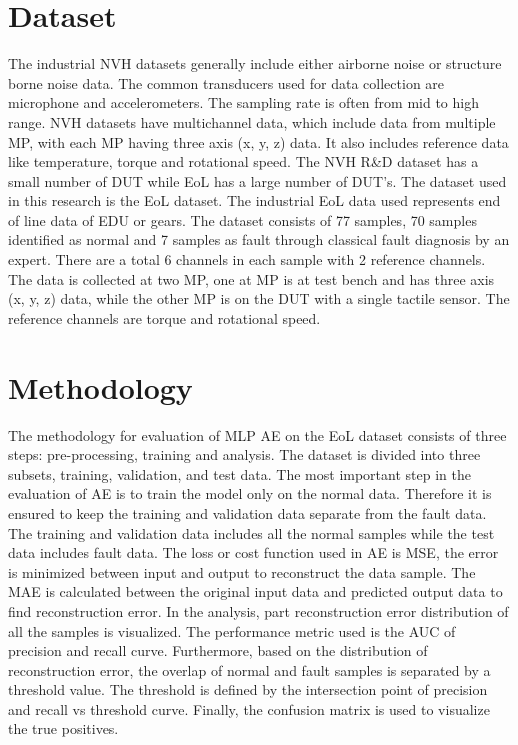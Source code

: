 \documentclass[conference]{IEEEtran}
\begin{document}
\section{Dataset}
The industrial NVH datasets generally include either airborne noise or structure borne noise data. The common transducers used for data collection are microphone and accelerometers. The sampling rate is often from mid to high range. NVH datasets have multichannel data, which include data from multiple MP, with each MP having three axis (x, y, z) data. It also includes reference data like temperature, torque and rotational speed. The NVH R\&D dataset has a small number of DUT while EoL has a large number of DUT’s. The dataset used in this research is the EoL dataset. The industrial EoL data used represents end of line data of EDU or gears. The dataset consists of 77 samples, 70 samples identified as normal and 7 samples as fault through classical fault diagnosis by an expert. There are a total 6 channels in each sample with 2 reference channels. The data is collected at two MP, one at MP is at test bench and has three axis (x, y, z) data, while the other MP is on the DUT with a single tactile sensor. The reference channels are torque and rotational speed.  



\section{Methodology}
The methodology for evaluation of MLP AE on the EoL dataset consists of three steps: pre-processing, training and analysis. The dataset is divided into three subsets, training,  validation, and test data. The most important step in the evaluation of AE is to train the model only on the normal data. Therefore it is ensured to keep the training and validation data separate from the fault data. The training and validation data includes all the normal samples while the test data includes fault data. The loss or cost function used in AE is MSE, the error is minimized between input and output to reconstruct the data sample. The MAE is calculated between the original input data and predicted output data to find reconstruction error. In the analysis, part reconstruction error distribution of all the samples is visualized. The performance metric used is the AUC of precision and recall curve. Furthermore, based on the distribution of reconstruction error, the overlap of normal and fault samples is separated by a threshold value. The threshold is defined by the intersection point of precision and recall vs threshold curve. Finally, the confusion matrix is used to visualize the true positives.     
\end{document}
